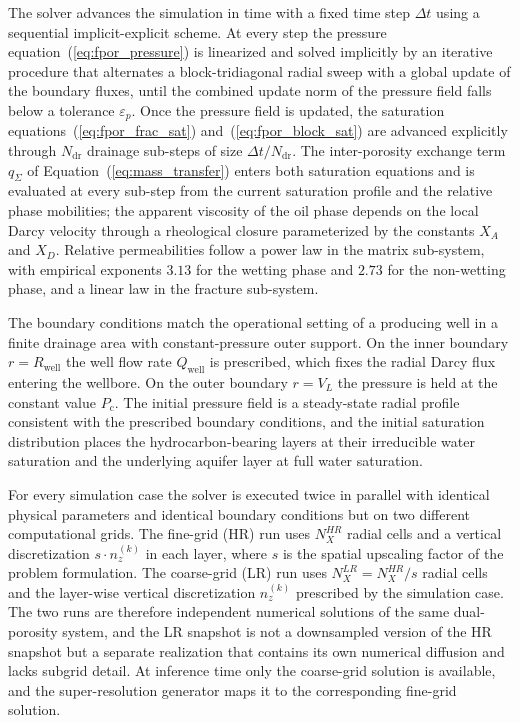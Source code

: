 The solver advances the simulation in time with a fixed time step $\Delta t$ using a sequential implicit-explicit scheme. At every step the pressure equation~(\ref{eq:fpor_pressure}) is linearized and solved implicitly by an iterative procedure that alternates a block-tridiagonal radial sweep with a global update of the boundary fluxes, until the combined update norm of the pressure field falls below a tolerance $\varepsilon_p$. Once the pressure field is updated, the saturation equations~(\ref{eq:fpor_frac_sat}) and~(\ref{eq:fpor_block_sat}) are advanced explicitly through $N_{\text{dr}}$ drainage sub-steps of size $\Delta t / N_{\text{dr}}$. The inter-porosity exchange term $q_\Sigma$ of Equation~(\ref{eq:mass_transfer}) enters both saturation equations and is evaluated at every sub-step from the current saturation profile and the relative phase mobilities; the apparent viscosity of the oil phase depends on the local Darcy velocity through a rheological closure parameterized by the constants $X_A$ and $X_D$. Relative permeabilities follow a power law in the matrix sub-system, with empirical exponents $3.13$ for the wetting phase and $2.73$ for the non-wetting phase, and a linear law in the fracture sub-system.

The boundary conditions match the operational setting of a producing well in a finite drainage area with constant-pressure outer support. On the inner boundary $r = R_{\text{well}}$ the well flow rate $Q_{\text{well}}$ is prescribed, which fixes the radial Darcy flux entering the wellbore. On the outer boundary $r = V_L$ the pressure is held at the constant value $P_{\text{c}}$. The initial pressure field is a steady-state radial profile consistent with the prescribed boundary conditions, and the initial saturation distribution places the hydrocarbon-bearing layers at their irreducible water saturation and the underlying aquifer layer at full water saturation.

For every simulation case the solver is executed twice in parallel with identical physical parameters and identical boundary conditions but on two different computational grids. The fine-grid (HR) run uses $N_X^{HR}$ radial cells and a vertical discretization $s \cdot n_z^{(k)}$ in each layer, where $s$ is the spatial upscaling factor of the problem formulation. The coarse-grid (LR) run uses $N_X^{LR} = N_X^{HR} / s$ radial cells and the layer-wise vertical discretization $n_z^{(k)}$ prescribed by the simulation case. The two runs are therefore independent numerical solutions of the same dual-porosity system, and the LR snapshot is not a downsampled version of the HR snapshot but a separate realization that contains its own numerical diffusion and lacks subgrid detail. At inference time only the coarse-grid solution is available, and the super-resolution generator maps it to the corresponding fine-grid solution.

